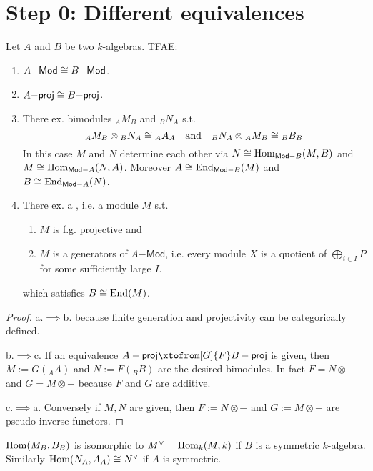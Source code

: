 \documentclass[fontsize=11pt,fleqn,a4paper]{scrartcl}
\begin{document}
\section{Step 0: Different equivalences}

\begin{theorem}[Morita]
Let $A$ and $B$ be two $k$-algebras. TFAE:
\begin{enumerate}
\item $A\mathsf{-Mod} \cong B\mathsf{-Mod}$.
\item $A\mathsf{-proj} \cong B\mathsf{-proj}$.
\item There ex. bimodules ${}_A M_B$ and ${}_B N_A$ s.t.
\[{}_A M_B \otimes {}_B N_A \cong {}_A A_A \quad\text{and}\quad {}_B N_A\otimes {}_A M_B \cong {}_B B_B\]
In this case $M$ and $N$ determine each other via $N\cong\operatorname{Hom}_{\mathsf{Mod-}B}(M,B)$ and $M\cong\operatorname{Hom}_{\mathsf{Mod-}A}(N,A)$. Moreover $A\cong\operatorname{End}_{\mathsf{Mod-}B}(M)$ and $B\cong\operatorname{End}_{\mathsf{Mod-}A}(N)$.
\item There ex. a , i.e. a module $M$ s.t.
\begin{enumerate}
\item $M$ is f.g. projective and
\item $M$ is a generators of $A\mathsf{-Mod}$, i.e. every module $X$ is a quotient of $\bigoplus_{i\in I} P$ for some sufficiently large $I$.
\end{enumerate}
which satisfies $B\cong\operatorname{End}(M)$.
\end{enumerate}
\end{theorem}
\begin{proof}
a.$\implies$b. because finite generation and projectivity can be categorically defined.

b.$\implies$c. If an equivalence $A-\mathsf{proj} \xtofrom[G]{F} B-\mathsf{proj}$ is given, then $M:=G({}_A A)$ and $N:=F({}_B B)$ are the desired bimodules. In fact $F=N\otimes-$ and $G=M\otimes-$ because $F$ and $G$ are additive.

c.$\implies$a. Conversely if $M,N$ are given, then $F:=N\otimes-$ and $G:=M\otimes-$ are pseudo-inverse functors.
\end{proof}

\begin{remark}
$\operatorname{Hom}(M_B,B_B)$ is isomorphic to $M^\vee=\operatorname{Hom}_k(M,k)$ if $B$ is a symmetric $k$-algebra. Similarly $\operatorname{Hom}(N_A,A_A)\cong N^\vee$ if $A$ is symmetric.
\end{remark}
\end{document}
